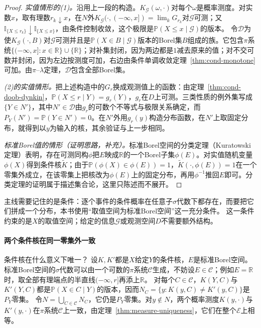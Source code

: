 \begin{proof}
\emph{实值情形的(1)。}沿用上一段的构造。$K_{\mathcal G}(\omega,\cdot)$对每个$\omega$是概率测度。对实数$x$，取有理数$r_k\downarrow x$，在$N$外$K_{\mathcal G}(\cdot,(-\infty,x])=\lim_kG_{r_k}$对$\mathcal G$可测；又$\mathbb I_{\{X\leq r_k\}}\downarrow\mathbb I_{\{X\leq x\}}$，由条件控制收敛，这个极限是$\mathbb P(X\leq x\mid\mathcal G)$的版本。
令$\mathcal D$为使$K_{\mathcal G}(\cdot,B)$对$\mathcal G$可测并且是$\mathbb P(X\in B\mid\mathcal G)$版本的Borel集$B$组成的族。它包含$\pi$系统$\{(-\infty,x]:x\in\mathbb R\}\cup\{\mathbb R\}$；对补集封闭，因为两边都是$1$减去原来的值；对不交可数并封闭，因为左边按测度可加，右边由条件单调收敛定理~\ref{thm:cond-monotone}可加。由$\pi$--$\lambda$定理，$\mathcal D$包含全部Borel集。

\emph{(2)的实值情形。}把上述构造中的$G_r$换成观测值上的函数：由定理~\ref{thm:cond-doob-dynkin}，$\mathbb P(X\leq r\mid Y)=g_r(Y)$，$g_r$在$D$上可测。三类性质的例外集写成$\{Y\in N'\}$，其中$N'\in\mathcal D$由$g_r$的可数个不等式与极限关系确定，而$P_Y(N')=\mathbb P(Y\in N')=0$。在$N'$外用$g_r(y)$构造分布函数，在$N'$上取固定分布，就得到以$y$为输入的核，其余验证与上一步相同。

\emph{标准Borel值的情形（证明思路，补充）。}标准Borel空间的分类定理（Kuratowski定理）表明，存在可测同构$\phi$把$E$映成$\mathbb R$的一个Borel子集$\phi(E)$。对实值随机变量$\phi(X)$得到条件核$\widetilde K$；由于$\mathbb P(\phi(X)\in\phi(E))=1$，$\widetilde K(\cdot,\phi(E))=1$在一个零集外成立，在该零集上把核改为$\phi(E)$上的固定分布，再用$\phi^{-1}$推回$E$即可。分类定理的证明属于描述集合论，这里只陈述而不展开。
\end{proof}

主线需要记住的是条件：逐个事件的条件概率在任意子$\sigma$代数下都存在，而要把它们拼成一个分布，本书使用“取值空间为标准Borel空间”这一充分条件。
这一条件约束的是$X$的取值空间；给定的信息$\mathcal G$或观测空间$D$不需要额外结构。

\paragraph{两个条件核在同一零集外一致}
条件核在什么意义下唯一？
设$K,K'$都是$X$给定$Y$的条件核，$E$是标准Borel空间。
标准Borel空间的$\sigma$代数可以由一个可数的$\pi$系统$\mathcal C$生成，不妨设$E\in\mathcal C$；例如$E=\mathbb R$时，取全部有理端点的半直线$(-\infty,r]$再添上$\mathbb R$。
对每个$C\in\mathcal C$，$K(Y,C)$与$K'(Y,C)$都是$\mathbb P(X\in C\mid Y)$的版本，因而$N_C=\{y:K(y,C)\neq K'(y,C)\}$是$P_Y$零集。
令$N=\bigcup_{C\in\mathcal C}N_C$，它仍是$P_Y$零集。对$y\notin N$，两个概率测度$K(y,\cdot)$与$K'(y,\cdot)$在$\pi$系统$\mathcal C$上一致，由定理~\ref{thm:measure-uniqueness}，它们在整个$\mathcal E$上相等。

